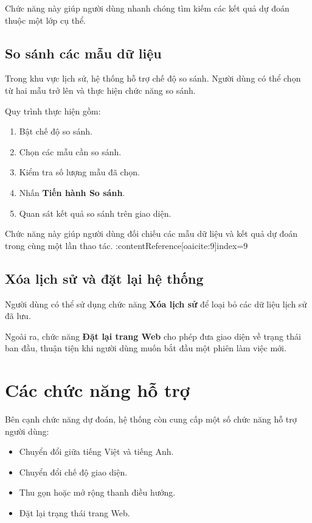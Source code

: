 \documentclass[12pt,a4paper]{report}
\begin{document}
	Chức năng này giúp người dùng nhanh chóng tìm kiếm các kết quả dự đoán thuộc một lớp cụ thể.
	
	\subsection{So sánh các mẫu dữ liệu}
	
	Trong khu vực lịch sử, hệ thống hỗ trợ chế độ so sánh. Người dùng có thể chọn từ hai mẫu trở lên và thực hiện chức năng so sánh.
	
	Quy trình thực hiện gồm:
	\begin{enumerate}
		\item Bật chế độ so sánh.
		\item Chọn các mẫu cần so sánh.
		\item Kiểm tra số lượng mẫu đã chọn.
		\item Nhấn \textbf{Tiến hành So sánh}.
		\item Quan sát kết quả so sánh trên giao diện.
	\end{enumerate}
	
	Chức năng này giúp người dùng đối chiếu các mẫu dữ liệu và kết quả dự đoán trong cùng một lần thao tác. :contentReference[oaicite:9]{index=9}
	
	\subsection{Xóa lịch sử và đặt lại hệ thống}
	
	Người dùng có thể sử dụng chức năng \textbf{Xóa lịch sử} để loại bỏ các dữ liệu lịch sử đã lưu.
	
	Ngoài ra, chức năng \textbf{Đặt lại trang Web} cho phép đưa giao diện về trạng thái ban đầu, thuận tiện khi người dùng muốn bắt đầu một phiên làm việc mới.
	
	\section{Các chức năng hỗ trợ}
	
	Bên cạnh chức năng dự đoán, hệ thống còn cung cấp một số chức năng hỗ trợ người dùng:
	
	\begin{itemize}
		\item Chuyển đổi giữa tiếng Việt và tiếng Anh.
		\item Chuyển đổi chế độ giao diện.
		\item Thu gọn hoặc mở rộng thanh điều hướng.
		\item Đặt lại trạng thái trang Web.
	\end{itemize}
	
\end{document}
